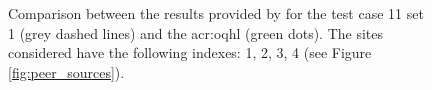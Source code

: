 \begin{description}
\begin{figure}[!ht]
\caption{Comparison between the results provided by \textcite{thomas2010}
for the test case 11 set 1 (grey dashed lines) and the \gls{acr:oqhl} 
(green dots). The sites considered have the following indexes: 
1, 2, 3, 4 (see Figure \ref{fig:peer_sources}).}
\label{fig:peer_set1_test11}
\end{figure}
\end{description}
